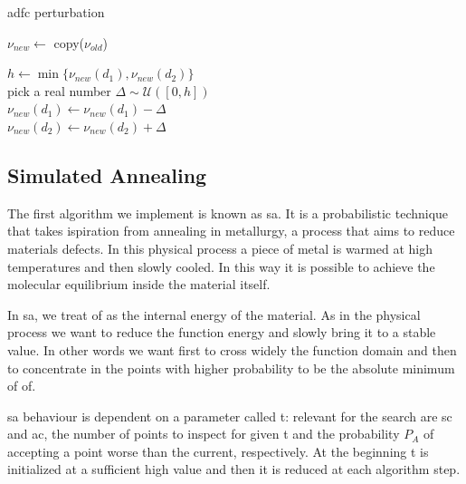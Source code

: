 \documentclass[12pt,journal,draftclsnofoot,onecolumn]{IEEEtran}
\begin{document}
\begin{algorithm}[htp]
\caption{\gls{adfc} perturbation} \label{algo:perturb_adfc}
	 {
		$\nu_{new} \gets$ copy($\nu_{old}$) \\


		$ h \gets \min\{\nu_{new}(d_1), \nu_{new}(d_2)\} $ \\
		pick a real number $\Delta \sim \mathcal{U}([0, h])$ \\

		$\nu_{new}(d_1) \gets \nu_{new}(d_1) - \Delta$ \\
		$\nu_{new}(d_2) \gets \nu_{new}(d_2) + \Delta$ \\
	}
\end{algorithm}

\clearpage
\subsection{Simulated Annealing}
The first algorithm we implement is known as \gls{sa}.
It is a probabilistic technique that takes ispiration from annealing in metallurgy, a process that aims to reduce materials defects.
In this physical process a piece of metal is warmed at high temperatures and then slowly cooled. In this way it is possible to achieve the molecular equilibrium inside the material itself.

In \gls{sa}, we treat \gls{of} as the internal energy of the material.
As in the physical process we want to reduce the function energy and slowly bring it to a stable value. In other words we want first to cross widely the function domain and then to concentrate in the points with higher probability to be the absolute minimum of \gls{of}.

\gls{sa} behaviour is dependent on a parameter called \gls{t}: relevant for the search are \gls{sc} and \gls{ac}, the number of points to inspect for given \gls{t} and the probability $P_A$ of accepting a point worse than the current, respectively. At the beginning \gls{t} is initialized at a sufficient high value and then it is reduced at each algorithm step.
\end{document}
